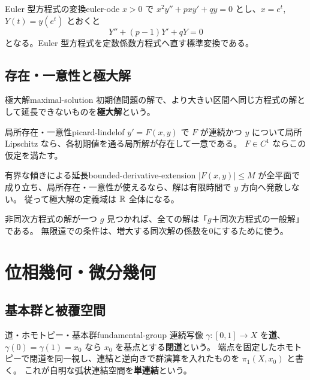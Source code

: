 \begin{proposition}{Euler 型方程式の変換}{euler-ode}
$x>0$ で $x^2y''+pxy'+qy=0$ とし、$x=e^t$, $Y(t)=y(e^t)$ とおくと
\[
 Y''+(p-1)Y'+qY=0
\]
となる。Euler 型方程式を定数係数方程式へ直す標準変換である。
\end{proposition}

\section{存在・一意性と極大解}

\begin{definition}{極大解}{maximal-solution}
初期値問題の解で、より大きい区間へ同じ方程式の解として延長できないものを\textbf{極大解}という。
\end{definition}

\begin{theorem}{局所存在・一意性}{picard-lindelof}
$y'=F(x,y)$ で $F$ が連続かつ $y$ について局所 Lipschitz なら、各初期値を通る局所解が存在して一意である。
$F\in C^1$ ならこの仮定を満たす。
\end{theorem}

\begin{proposition}{有界な傾きによる延長}{bounded-derivative-extension}
$|F(x,y)|\le M$ が全平面で成り立ち、局所存在・一意性が使えるなら、解は有限時間で $y$ 方向へ発散しない。
従って極大解の定義域は $\mathbb{R}$ 全体になる。
\end{proposition}

\begin{memo*}
非同次方程式の解が一つ $g$ 見つかれば、全ての解は「$g$＋同次方程式の一般解」である。
無限遠での条件は、増大する同次解の係数を0にするために使う。
\end{memo*}

\chapter{位相幾何・微分幾何}
\label{ch:topology-geometry}

\section{基本群と被覆空間}

\begin{definition}{道・ホモトピー・基本群}{fundamental-group}
連続写像 $\gamma:[0,1]\to X$ を\textbf{道}、$\gamma(0)=\gamma(1)=x_0$ なら $x_0$ を基点とする\textbf{閉道}という。
端点を固定したホモトピーで閉道を同一視し、連結と逆向きで群演算を入れたものを $\pi_1(X,x_0)$ と書く。
これが自明な弧状連結空間を\textbf{単連結}という。
\end{definition}

